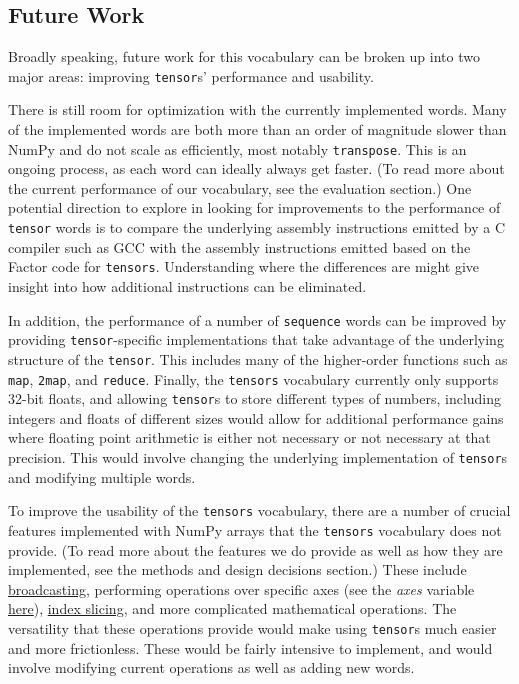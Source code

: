 \documentclass[
]{article}
\begin{document}
\hypertarget{future-work-2}{%
\subsection{Future Work}\label{future-work-2}}

Broadly speaking, future work for this vocabulary can be broken up into
two major areas: improving \texttt{tensor}s' performance and usability.

There is still room for optimization with the currently implemented
words. Many of the implemented words are both more than an order of
magnitude slower than NumPy and do not scale as efficiently, most
notably \texttt{transpose}. This is an ongoing process, as each word can
ideally always get faster. (To read more about the current performance
of our vocabulary, see the evaluation section.) One potential direction
to explore in looking for improvements to the performance of
\texttt{tensor} words is to compare the underlying assembly instructions
emitted by a C compiler such as GCC with the assembly instructions
emitted based on the Factor code for \texttt{tensors}. Understanding
where the differences are might give insight into how additional
instructions can be eliminated.

In addition, the performance of a number of \texttt{sequence} words can
be improved by providing \texttt{tensor}-specific implementations that
take advantage of the underlying structure of the \texttt{tensor}. This
includes many of the higher-order functions such as \texttt{map},
\texttt{2map}, and \texttt{reduce}. Finally, the \texttt{tensors}
vocabulary currently only supports 32-bit floats, and allowing
\texttt{tensor}s to store different types of numbers, including integers
and floats of different sizes would allow for additional performance
gains where floating point arithmetic is either not necessary or not
necessary at that precision. This would involve changing the underlying
implementation of \texttt{tensor}s and modifying multiple words.

To improve the usability of the \texttt{tensors} vocabulary, there are a
number of crucial features implemented with NumPy arrays that the
\texttt{tensors} vocabulary does not provide. (To read more about the
features we do provide as well as how they are implemented, see the
methods and design decisions section.) These include
\href{https://docs.scipy.org/doc/numpy/user/basics.broadcasting.html}{broadcasting},
performing operations over specific axes (see the \emph{axes} variable
\href{https://numpy.org/doc/stable/reference/generated/numpy.transpose.html}{here}),
\href{https://numpy.org/doc/stable/reference/arrays.indexing.html}{index
slicing}, and more complicated mathematical operations. The versatility
that these operations provide would make using \texttt{tensor}s much
easier and more frictionless. These would be fairly intensive to
implement, and would involve modifying current operations as well as
adding new words.
\end{document}
